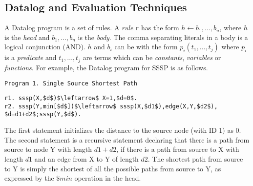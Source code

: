 
\subsection{Datalog and Evaluation Techniques}

A Datalog program is a set of rules. A \emph{rule} \texttt{r} has the form $h\leftarrow b_1,\ldots,b_n$, where $h$ is the \emph{head} and $b_1,\ldots,b_n$ is the \emph{body}. The comma separating literals in a body is a logical conjunction (AND). $h$ and $b_i$ can be with the form $p_i(t_1,\ldots,t_j)$ where $p_i$ is a \emph{predicate} and $t_1,\ldots,t_j$ are terms which can be \emph{constants}, \emph{variables} or \emph{functions}. For example, the Datalog program for SSSP is as follows.
\begin{verbatim}
Program 1. Single Source Shortest Path
\end{verbatim}
\vspace{-0.1in}
\small
\begin{lstlisting}
r1. sssp(X,$d$)$\leftarrow$ X=1,$d=0$.
r2. sssp(Y,min[$d$])$\leftarrow$ sssp(X,$d1$),edge(X,Y,$d2$),
$d=d1+d2$;sssp(Y,$d$).
\end{lstlisting}
\normalsize
The first statement initializes the distance to the source node (with ID 1) as 0. The second statement is a recursive statement declaring that there is a path from source to node Y with length $d1+d2$, if there is a path from source to X with length $d1$ and an edge from X to Y of length $d2$. The shortest path from source to Y is simply the shortest of all the possible paths from source to Y, as expressed by the $\$min$ operation in the head.  


